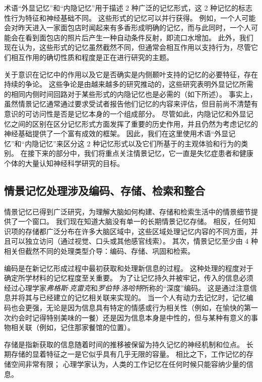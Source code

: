术语“外显记忆”和“内隐记忆”用于描述 2 种广泛的记忆形式，这 2 种记忆的标志性行为特征和神经基础不同。
这些形式的记忆可以并行获得。
例如，一个人可能会对昨天进入一家面包店时闻起来有多香形成明确的记忆，而与此同时，一个人可能会在看到面包店的照片后产生一种自动条件反射，即流口水增加。
此外，我们现在认为，这些形式的记忆虽然截然不同，但通常会相互作用以支持行为，尽管它们相互作用的确切性质和程度是正在进行研究的主题。


关于意识在记忆中的作用以及它是否确实是内侧颞叶支持的记忆的必要特征，存在持续的争论。
这些争论是由越来越多的研究推动的，这些研究表明外显记忆所需的相同内侧时间回路对于某些形式的内隐记忆也是必需的（如下所述）。
事实上，虽然情景记忆通常通过要求受试者报告他们记忆的内容来评估，但目前尚不清楚有意识的可访问性是否是记忆本身的一个组成部分。
尽管如此，内隐记忆和外显记忆之间的区别在区分记忆形式方面发挥了重要的历史作用，并且仍然为考虑记忆的神经基础提供了一个富有成效的框架。
因此，我们在这里使用术语“外显记忆”和“内隐记忆”来区分这 2 种记忆形式以及它们所基于的主观体验和行为的类别。
在接下来的部分中，我们将重点关注情景记忆，它一直是失忆症患者和健康个体的大量认知神经科学研究的目标。



\subsection{情景记忆处理涉及编码、存储、检索和整合}

情景记忆已得到广泛研究，为理解大脑如何构建、存储和检索生活中的情景细节提供了一个窗口。
我们现在知道大脑没有单一的长期情景记忆存储。
相反，任何知识项的存储都广泛分布在许多大脑区域中，这些区域处理记忆内容的不同方面，并且可以独立访问（通过视觉、口头或其他感官线索）。
其次，情景记忆至少由 4 种相关但截然不同的处理类型介导：编码、存储、巩固和检索。


编码是在新记忆形成过程中最初获取和处理新信息的过程。
这种处理的程度对于确定所学材料的记忆程度至关重要。
为了让记忆持久并被牢记，传入的信息必须经过心理学家\textit{弗格斯$\cdot$克雷克}和\textit{罗伯特$\cdot$洛哈特}所称的“深度”编码。
这是通过注意信息并将其与已经建立的记忆相关联来实现的。
当一个人有动力去记忆时，记忆编码也会更强，无论是因为信息具有特定的情感或行为相关性（例如，在愉快的第一次约会时记得特别美味的一餐）还是因为信息本身是中性的，但与某种有意义的事物相关联（例如，记住那家餐馆的位置）。


存储是指新获取的信息随着时间的推移被保留为持久记忆的神经机制和位点。
长期存储的显着特征之一是它似乎具有几乎无限的容量。
相比之下，工作记忆的存储空间非常有限；
心理学家认为，人类的工作记忆在任何时候只能容纳少量的信息。


